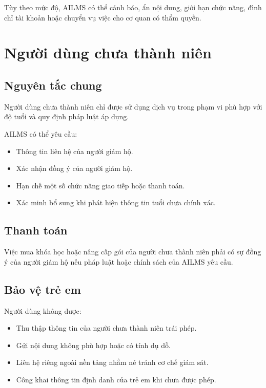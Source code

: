 \documentclass[12pt,a4paper]{article}
\begin{document}
Tùy theo mức độ, AILMS có thể cảnh báo, ẩn nội dung, giới hạn chức năng,
đình chỉ tài khoản hoặc chuyển vụ việc cho cơ quan có thẩm quyền.

\section{Người dùng chưa thành niên}

\subsection{Nguyên tắc chung}

Người dùng chưa thành niên chỉ được sử dụng dịch vụ trong phạm vi phù hợp
với độ tuổi và quy định pháp luật áp dụng.

AILMS có thể yêu cầu:

\begin{itemize}
    \item Thông tin liên hệ của người giám hộ.
    \item Xác nhận đồng ý của người giám hộ.
    \item Hạn chế một số chức năng giao tiếp hoặc thanh toán.
    \item Xác minh bổ sung khi phát hiện thông tin tuổi chưa chính xác.
\end{itemize}

\subsection{Thanh toán}

Việc mua khóa học hoặc nâng cấp gói của người chưa thành niên phải có sự đồng ý
của người giám hộ nếu pháp luật hoặc chính sách của AILMS yêu cầu.

\subsection{Bảo vệ trẻ em}

Người dùng không được:

\begin{itemize}
    \item Thu thập thông tin của người chưa thành niên trái phép.
    \item Gửi nội dung không phù hợp hoặc có tính dụ dỗ.
    \item Liên hệ riêng ngoài nền tảng nhằm né tránh cơ chế giám sát.
    \item Công khai thông tin định danh của trẻ em khi chưa được phép.
\end{itemize}
\end{document}
